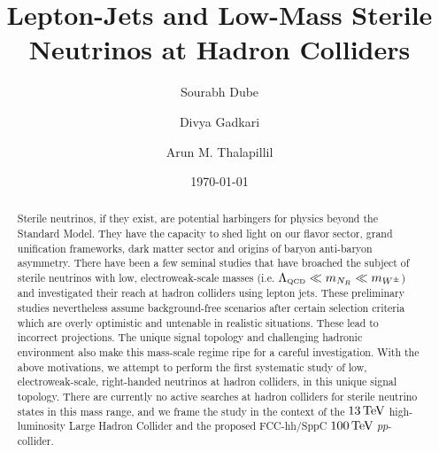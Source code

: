 \documentclass[reprint,doublecolumn,secnumarabic,amssymb, amsmath, aps,nofootinbib,superscriptaddress]{revtex4-1}
\begin{document}
\title{Lepton-Jets and Low-Mass Sterile Neutrinos at Hadron Colliders}



\author{Sourabh Dube}
\author{Divya Gadkari}
\author{Arun M. Thalapillil}


\date{\today}



\begin{abstract}
Sterile neutrinos, if they exist, are potential harbingers for physics beyond the Standard Model. They have the capacity to shed light on our flavor sector, grand unification frameworks, dark matter sector and origins of baryon anti-baryon asymmetry. There have been a few seminal studies that have broached the subject of sterile neutrinos with low, electroweak-scale masses (i.e. $\Lambda_{\text{\tiny{QCD}}} \ll m_{N_R} \ll m_{W^\pm}$) and investigated their reach at hadron colliders using lepton jets. These preliminary studies nevertheless assume background-free scenarios after certain selection criteria which are overly optimistic and untenable in realistic situations. These lead to incorrect projections. The unique signal topology and challenging hadronic environment also make this mass-scale regime ripe for a careful investigation. With the above motivations, we attempt to perform the first systematic study of low, electroweak-scale, right-handed neutrinos at hadron colliders, in this unique signal topology. There are currently no active searches at hadron colliders for sterile neutrino states in this mass range, and we frame the study in the context of the $13\,\rm{TeV}$ high-luminosity Large Hadron Collider and the proposed FCC-hh/SppC $100\,\rm{TeV}$ $pp$-collider.
\end{abstract}

\maketitle
\end{document}
